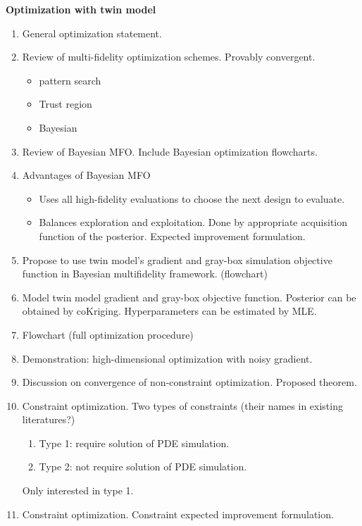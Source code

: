 \documentclass[a4paper,onecolumn]{article}
\theoremstyle{remark}
\begin{document}
\newpage
\textbf{Optimization with twin model}
\begin{enumerate}
    \item General optimization statement.
    \item Review of multi-fidelity optimization schemes. Provably convergent.
          \begin{itemize}
              \item pattern search
              \item Trust region
              \item Bayesian
          \end{itemize}
    \item Review of Bayesian MFO.
          Include Bayesian optimization flowcharts.
    \item Advantages of Bayesian MFO
          \begin{itemize}
              \item Uses all high-fidelity evaluations to choose the next design to evaluate.
              \item Balances exploration and exploitation. Done by appropriate acquisition function of the posterior.
                    Expected improvement formulation.
          \end{itemize}
    \item Propose to use twin model's gradient and gray-box simulation objective function in
          Bayesian multifidelity framework.
          (flowchart)
    \item Model twin model gradient and gray-box objective function.
          Posterior can be obtained by coKriging. Hyperparameters can be estimated by MLE.
    \item Flowchart (full optimization procedure)
    \item Demonstration: high-dimensional optimization with noisy gradient.
    \item Discussion on convergence of non-constraint optimization. Proposed theorem.
    \item Constraint optimization. Two types of constraints (their names in existing literatures?)
          \begin{enumerate}
              \item Type 1: require solution of PDE simulation.
              \item Type 2: not require solution of PDE simulation.
          \end{enumerate}
          Only interested in type 1.
    \item Constraint optimization. Constraint expected improvement formulation.
\end{enumerate}
\end{document}
